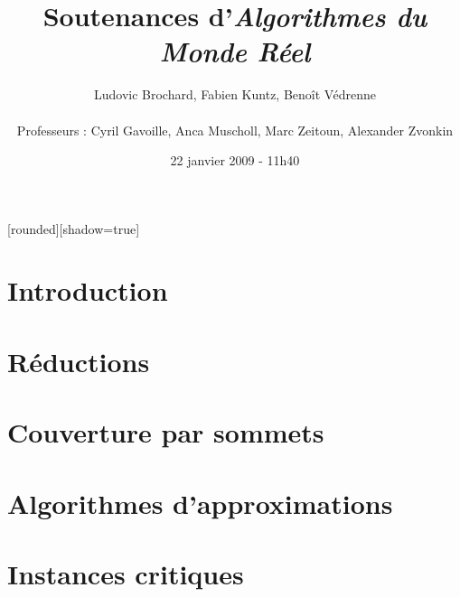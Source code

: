 \documentclass[8pt]{beamer}
\begin{document}

[rounded][shadow=true]

\author[Ludovic Brochard, Fabien Kuntz, Benoît Védrenne]{Ludovic
Brochard, Fabien Kuntz, Benoît Védrenne\\ 
~\\
\small Professeurs : Cyril Gavoille, Anca Muscholl, Marc Zeitoun,
Alexander Zvonkin}
\title{Soutenances d'\textit{Algorithmes du Monde Réel}} 
\date{22 janvier 2009 - 11h40}

\setcounter{page}{1}

\frame{\titlepage}
\frame{\tableofcontents}

 \section{Introduction}
 \frame{\tableofcontents[current]}
 

 \section{Réductions}
 \frame{\tableofcontents[current]}
 

 \section{Couverture par sommets}
 \frame{\tableofcontents[current]}
  

 \section{Algorithmes d'approximations}
 \frame{\tableofcontents[current]}
  
  
 \section{Instances critiques}
 \frame{\tableofcontents[current]}
  
\end{document}
